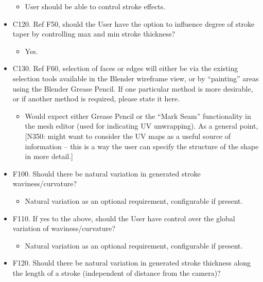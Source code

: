 \begin{itemize}
  \begin{itemize}
  \tightlist
  \item
    User should be able to control stroke effects.
  \end{itemize}
\item
  C120. Ref F50, should the User have the option to influence degree of
  stroke taper by controlling max and min stroke thickness?

  \begin{itemize}
  \tightlist
  \item
    Yes.
  \end{itemize}
\item
  C130. Ref F60, selection of faces or edges will either be via the
  existing selection tools available in the Blender wireframe view, or
  by ``painting'' areas using the Blender Grease Pencil. If one
  particular method is more desirable, or if another method is required,
  please state it here.

  \begin{itemize}
  \tightlist
  \item
    Would expect either Grease Pencil or the ``Mark Seam'' functionality
    in the mesh editor (used for indicating UV unwrapping). As a general
    point, {[}N350: might want to consider the UV maps as a useful
    source of information -- this is a way the user can specify the
    structure of the shape in more detail.{]}
  \end{itemize}
\item
  F100. Should there be natural variation in generated stroke
  waviness/curvature?

  \begin{itemize}
  \tightlist
  \item
    Natural variation as an optional requirement, configurable if
    present.
  \end{itemize}
\item
  F110. If yes to the above, should the User have control over the
  global variation of waviness/curvature?

  \begin{itemize}
  \tightlist
  \item
    Natural variation as an optional requirement, configurable if
    present.
  \end{itemize}
\item
  F120. Should there be natural variation in generated stroke thickness
  along the length of a stroke (independent of distance from the
  camera)?


\end{itemize}
